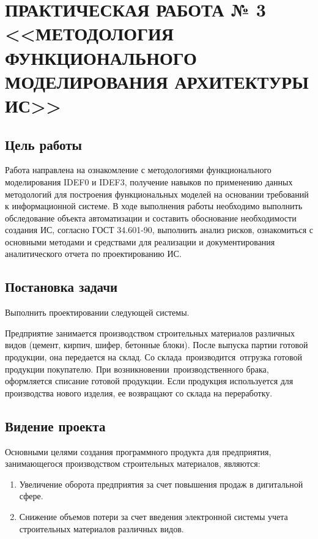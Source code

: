 \chapter{ПРАКТИЧЕСКАЯ РАБОТА № 3 <<МЕТОДОЛОГИЯ ФУНКЦИОНАЛЬНОГО МОДЕЛИРОВАНИЯ АРХИТЕКТУРЫ ИС>>}

\section{Цель работы}

Работа направлена на ознакомление с методологиями функционального моделирования IDEF0 и IDEF3, получение навыков по применению данных методологий для построения функциональных моделей на основании требований к информационной системе. В ходе выполнения работы необходимо выполнить обследование объекта автоматизации и составить обоснование необходимости создания ИС, согласно ГОСТ 34.601-90, выполнить анализ рисков, ознакомиться с основными методами и средствами для реализации и документирования аналитического отчета по проектированию ИС.

\section{Постановка задачи}

Выполнить проектировании следующей системы.

Предприятие занимается производством строительных материалов различных видов (цемент, кирпич, шифер, бетонные блоки). После выпуска партии готовой продукции, она передается на склад. Со склада производится отгрузка готовой продукции покупателю. При возникновении производственного брака, оформляется списание готовой продукции. Если продукция используется для производства нового изделия, ее возвращают со склада на переработку.

\section{Видение проекта}

Основными целями создания программного продукта для предприятия, занимающегося производством строительных материалов, являются:

\begin{enumerate}
	\item{Увеличение оборота предприятия за счет повышения продаж в дигитальной сфере.}
	\item{Снижение объемов потери за счет введения электронной системы учета строительных материалов различных видов.}
\end{enumerate}

